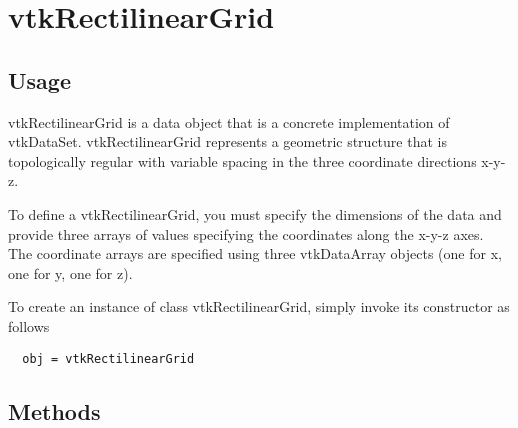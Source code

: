 \section{vtkRectilinearGrid}

\subsection{Usage}

 vtkRectilinearGrid is a data object that is a concrete implementation of
 vtkDataSet. vtkRectilinearGrid represents a geometric structure that is 
 topologically regular with variable spacing in the three coordinate
 directions x-y-z.

 To define a vtkRectilinearGrid, you must specify the dimensions of the
 data and provide three arrays of values specifying the coordinates 
 along the x-y-z axes. The coordinate arrays are specified using three 
 vtkDataArray objects (one for x, one for y, one for z).

To create an instance of class vtkRectilinearGrid, simply
invoke its constructor as follows
\begin{verbatim}
  obj = vtkRectilinearGrid
\end{verbatim}
\subsection{Methods}

